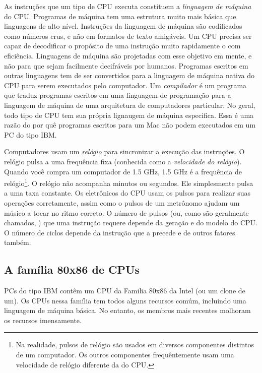 As instruções que um tipo de CPU executa constituem a \emph{linguagem de 
máquina} do CPU.  Programas de máquina tem uma 
estrutura muito mais básica que linguagens de alto nível. Instruções da 
linguagem de máquina são codificados como números crus, e não em formatos de 
texto amigáveis. Um CPU precisa ser capaz de decodificar o propósito de uma 
instrução muito rapidamente o com eficiência. Linguagens de máquina são 
projetadas com esse objetivo em mente, e não para que sejam facilmente 
decifráveis por humanos. Programas escritos em outras linguagens tem de ser 
convertidos para a linguagem de máquina nativa do CPU para serem executados 
pelo computador. Um \emph{compilador}  é um programa que 
traduz programas escritos em uma linguagem de programação para a linguagem de 
máquina de uma arquitetura de computadores particular. No geral, todo tipo de 
CPU tem sua própria lignaugem de máquina especifica. Essa é uma razão do por 
quê programas escritos para um Mac não podem executados em um PC do tipo IBM.

Computadores usam um \emph{relógio}  para sincronizar a execução 
das  
instruções. O relógio pulsa a uma frequência fixa (conhecida como a 
\emph{velocidade do relógio}). Quando você compra um computador de 1.5 GHz, 
1.5 GHz é a frequência de relógio\footnote{Na realidade, pulsos de relógio são 
usados em diversos componentes distintos de um computador. Os outros 
componentes frequêntemente usam uma velocidade de relógio diferente da do 
CPU.}. O relógio não acompanha minutos ou segundos. Ele simplesmente pulsa a 
uma taxa constante. Os eletrônicos do CPU usam os pulsos para realizar suas 
operações corretamente, assim como o pulsos de um metrônomo ajudam um músico a 
tocar no ritmo correto. O número de pulsos (ou, como são geralmente chamados, 
) que uma instrução requere depende da geração e do modelo do CPU.
O número de ciclos depende da instrução que a precede e de outros fatores 
também.


\subsection{A família 80x86 de CPUs}

PCs do tipo IBM contêm um CPU da Familia 80x86 da Intel (ou um clone de um).
Os CPUs nessa família tem todos alguns recursos comúm, incluindo uma linguagem 
de máquina básica. No entanto, os membros mais recentes molhoram os recursos 
imensamente.

